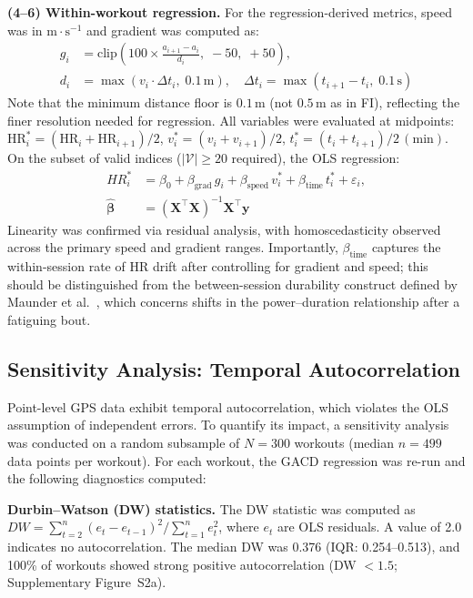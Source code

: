 \documentclass[times, twoside]{zHenriquesLab-StyleBioRxiv}
\begin{document}
\textbf{(4--6) Within-workout regression.} For the regression-derived metrics, speed was in $\mathrm{m{\cdot}s^{-1}}$ and gradient was computed as:
\begin{align*}
  g_i &= \text{clip}\!\left(100 \times \frac{a_{i+1} - a_i}{d_i},\; -50,\; +50\right), \\
  d_i &= \max(v_i \cdot \Delta t_i,\; 0.1\,\mathrm{m}), \quad \Delta t_i = \max(t_{i+1} - t_i,\; 0.1\,\mathrm{s})
\end{align*}
Note that the minimum distance floor is $0.1\,\mathrm{m}$ (not $0.5\,\mathrm{m}$ as in FI), reflecting the finer resolution needed for regression. All variables were evaluated at midpoints: $\text{HR}^*_i = (\text{HR}_i + \text{HR}_{i+1})/2$, $v^*_i = (v_i + v_{i+1})/2$, $t^*_i = (t_i + t_{i+1})/2\,\mathrm{(min)}$. On the subset of valid indices ($|\mathcal{V}| \geq 20$ required), the OLS regression:
\begin{align}
  \mathit{HR}^*_i &= \beta_0 + \beta_{\text{grad}} \, g_i + \beta_{\text{speed}} \, v^*_i + \beta_{\text{time}} \, t^*_i + \varepsilon_i, \label{eq:gacd} \\
  \hat{\boldsymbol{\beta}} &= (\mathbf{X}^\top \mathbf{X})^{-1} \mathbf{X}^\top \mathbf{y} \nonumber
\end{align}
Linearity was confirmed via residual analysis, with homoscedasticity observed across the primary speed and gradient ranges. Importantly, $\beta_{\text{time}}$ captures the within-session rate of HR drift after controlling for gradient and speed; this should be distinguished from the between-session durability construct defined by Maunder et al.\ \cite{maunder2021}, which concerns shifts in the power--duration relationship after a fatiguing bout.

\subsection*{Sensitivity Analysis: Temporal Autocorrelation}

Point-level GPS data exhibit temporal autocorrelation, which violates the OLS assumption of independent errors. To quantify its impact, a sensitivity analysis was conducted on a random subsample of $N = 300$ workouts (median $n = 499$ data points per workout). For each workout, the GACD regression was re-run and the following diagnostics computed:

\textbf{Durbin--Watson (DW) statistics.} The DW statistic was computed as $DW = \sum_{t=2}^{n}(e_t - e_{t-1})^2 / \sum_{t=1}^{n} e_t^2$, where $e_t$ are OLS residuals. A value of 2.0 indicates no autocorrelation. The median DW was 0.376 (IQR: 0.254--0.513), and 100\% of workouts showed strong positive autocorrelation (DW $< 1.5$; Supplementary Figure~S2a).
\end{document}
